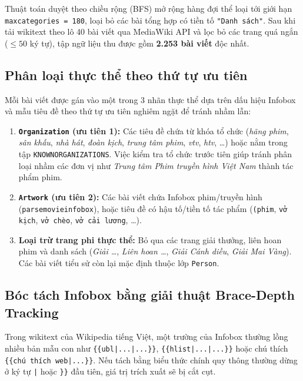 \documentclass[12pt,a4paper]{article}
\renewcommand{\_}{\oldunderscore\hspace{0pt}}
\begin{document}
Thuật toán duyệt theo chiều rộng (BFS) mở rộng hàng đợi thể loại tới giới hạn \texttt{max\_categories = 180}, loại bỏ các bài tổng hợp có tiền tố \texttt{"Danh sách"}. Sau khi tải wikitext theo lô 40 bài viết qua MediaWiki API và lọc bỏ các trang quá ngắn ($\le 50$ ký tự), tập ngữ liệu thu được gồm \textbf{2.253 bài viết} độc nhất.

\subsection{Phân loại thực thể theo thứ tự ưu tiên}

Mỗi bài viết được gán vào một trong 3 nhãn thực thể dựa trên dấu hiệu Infobox và mẫu tiêu đề theo thứ tự ưu tiên nghiêm ngặt để tránh nhầm lẫn:
\begin{enumerate}
  \item \textbf{\texttt{Organization} (ưu tiên 1):} Các tiêu đề chứa từ khóa tổ chức (\textit{hãng phim}, \textit{sân khấu}, \textit{nhà hát}, \textit{đoàn kịch}, \textit{trung tâm phim}, \textit{vtv}, \textit{htv}, \dots) hoặc nằm trong tập \texttt{KNOWN\_ORGANIZATIONS}. Việc kiểm tra tổ chức trước tiên giúp tránh phân loại nhầm các đơn vị như \textit{Trung tâm Phim truyền hình Việt Nam} thành tác phẩm phim.
  \item \textbf{\texttt{Artwork} (ưu tiên 2):} Các bài viết chứa Infobox phim/\allowbreak truyền hình (\texttt{parse\_movie\_infobox}), hoặc tiêu đề có hậu tố/\allowbreak tiền tố tác phẩm (\texttt{(phim}, \texttt{vở kịch}, \texttt{vở chèo}, \texttt{vở cải lương}, \dots).
  \item \textbf{Loại trừ trang phi thực thể:} Bỏ qua các trang giải thưởng, liên hoan phim và danh sách (\textit{Giải \dots}, \textit{Liên hoan \dots}, \textit{Giải Cánh diều}, \textit{Giải Mai Vàng}). Các bài viết tiểu sử còn lại mặc định thuộc lớp \texttt{Person}.
\end{enumerate}

\subsection{Bóc tách Infobox bằng giải thuật Brace-Depth Tracking}

Trong wikitext của Wikipedia tiếng Việt, một trường của Infobox thường lồng nhiều bản mẫu con như \texttt{\{\{ubl|...|...\}\}}, \texttt{\{\{hlist|...|...\}\}} hoặc chú thích \texttt{\{\{chú thích web|...\}\}}. Nếu tách bằng biểu thức chính quy thông thường dừng ở ký tự \texttt{|} hoặc \texttt{\}\}} đầu tiên, giá trị trích xuất sẽ bị cắt cụt.
\end{document}
